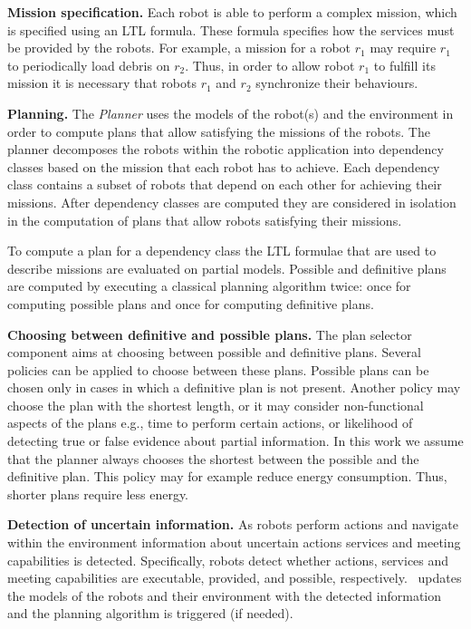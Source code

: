 \textbf{Mission specification.}
Each robot is able to perform a complex mission, which is specified using an LTL formula.
These formula specifies how the services must be provided by the robots.
For example, a mission for a robot $r_1$ may require $r_1$ to  periodically load debris on $r_2$.
Thus, in order to allow robot $r_1$ to fulfill its mission it is necessary that robots $r_1$ and $r_2$ synchronize their behaviours.





\textbf{Planning.} 
The \emph{Planner}  uses the models of the robot(s) and the environment in order to compute plans that allow satisfying the missions of the robots.
The planner decomposes the robots within the robotic application into dependency classes based on the mission that each robot has to achieve.
Each dependency class contains a subset of robots that depend on each other for achieving their missions.
After  dependency classes are computed they are considered in isolation in the computation of plans that allow robots satisfying their missions.

To compute a plan for a dependency class the  LTL formulae that are used to describe missions are evaluated on partial models.
Possible and definitive plans are computed by executing a classical planning algorithm twice: once for computing possible plans and once for computing definitive plans.



\textbf{Choosing between definitive and possible plans.}
The plan selector component aims at choosing between possible and definitive plans.
Several policies can be applied to choose between these plans.
Possible plans can be chosen only in cases in which a definitive plan is  not present.
Another policy may choose the plan with the shortest length, or it may consider non-functional aspects of the plans e.g., time to perform certain actions, or likelihood of detecting true or false evidence about partial information. 
In this work we assume  that the planner always chooses the shortest between the possible and the definitive plan.
This policy may for example reduce energy consumption.%
Thus, shorter plans require less energy.

\textbf{Detection of uncertain information.}
As robots perform actions and navigate within the environment information about uncertain actions services and meeting capabilities is detected.
Specifically, robots detect whether actions, services and meeting capabilities are executable, provided, and possible, respectively.
\toolName\ updates the models of the robots and their environment with the detected information and the planning algorithm is triggered (if needed).






